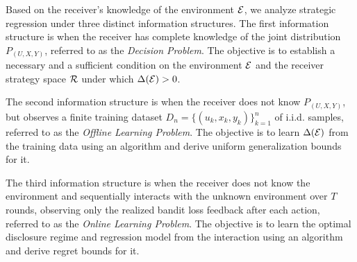 Based on the receiver's knowledge of the environment $\mathcal{E}$, we analyze strategic regression under three distinct information structures. The first information structure is when the receiver has complete knowledge of the joint distribution $P_{(U,X,Y)}$, referred to as the \textit{Decision Problem}. The objective is to establish a necessary and a sufficient condition on the environment $\mathcal{E}$ and the receiver strategy space $\mathcal{R}$ under which $\Delta(\mathcal{E}) > 0$.

The second information structure is when the receiver does not know $P_{(U,X,Y)}$, but observes a finite training dataset $D_n = \{(u_k, x_k, y_k)\}_{k=1}^n$ of i.i.d. samples, referred to as the \textit{Offline Learning Problem}. The objective is to learn $\Delta(\mathcal{E})$ from the training data using an algorithm and derive uniform generalization bounds for it.

The third information structure is when the receiver does not know the environment and sequentially interacts with the unknown environment over $T$ rounds, observing only the realized bandit loss feedback after each action, referred to as the \textit{Online Learning Problem}. The objective is to learn the optimal disclosure regime and regression model from the interaction using an algorithm and derive regret bounds for it.
